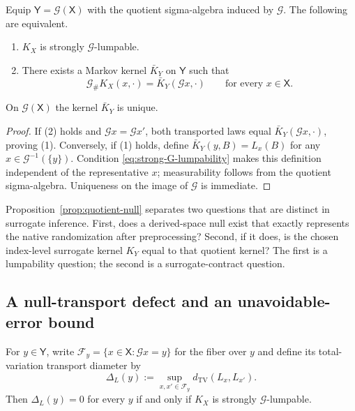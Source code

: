 \begin{proposition}\label{prop:quotient-null}
Equip $\mathsf Y=\mathcal G(\mathsf X)$ with the quotient sigma-algebra induced
by $\mathcal G$.  The following are equivalent.
\begin{enumerate}
\item $K_X$ is strongly $\mathcal G$-lumpable.
\item There exists a Markov kernel $\bar K_Y$ on $\mathsf Y$ such that
\begin{equation}
\mathcal G_\#K_X(x,\cdot)
=\bar K_Y(\mathcal Gx,\cdot)
\qquad\text{for every }x\in\mathsf X.
\label{eq:quotient-kernel}
\end{equation}
\end{enumerate}
On $\mathcal G(\mathsf X)$ the kernel $\bar K_Y$ is unique.
\end{proposition}

\begin{proof}
If (2) holds and $\mathcal Gx=\mathcal Gx'$, both transported laws equal
$\bar K_Y(\mathcal Gx,\cdot)$, proving (1).  Conversely, if (1) holds, define
$\bar K_Y(y,B)=L_x(B)$ for any $x\in\mathcal G^{-1}(\{y\})$.  Condition
\eqref{eq:strong-G-lumpability} makes this definition independent of the
representative $x$; measurability follows from the quotient sigma-algebra.
Uniqueness on the image of $\mathcal G$ is immediate.
\end{proof}

Proposition~\ref{prop:quotient-null} separates two questions that are distinct
in surrogate inference.  First, does a derived-space null exist that exactly
represents the native randomization after preprocessing?  Second, if it does,
is the chosen index-level surrogate kernel $K_Y$ equal to that quotient
kernel?  The first is a lumpability question; the second is a surrogate-contract
question.

\subsection{A null-transport defect and an unavoidable-error bound}

For $y\in\mathsf Y$, write
$\mathcal F_y=\{x\in\mathsf X:\mathcal Gx=y\}$ for the fiber over $y$ and define
its total-variation transport diameter by
\begin{equation}
\Delta_L(y)
:=\sup_{x,x'\in\mathcal F_y}
 d_{\mathrm{TV}}(L_x,L_{x'}).
\label{eq:lumpability-defect}
\end{equation}
Then $\Delta_L(y)=0$ for every $y$ if and only if $K_X$ is strongly
$\mathcal G$-lumpable.

